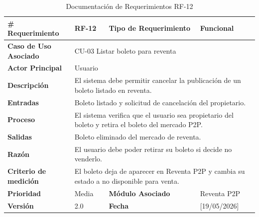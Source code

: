 \documentclass[12pt,letterpaper]{article}
\begin{document}
\begin{table}[H]
\centering
\scriptsize
\renewcommand{\arraystretch}{1.05}
\setlength{\tabcolsep}{3pt}

\newlength{\anchoceldaRFdoce}
\setlength{\anchoceldaRFdoce}{\dimexpr\textwidth-2.7cm-8\tabcolsep-5\arrayrulewidth\relax}

\begin{tabularx}{\textwidth}{|p{2.7cm}|X|p{2.8cm}|X|}
\hline
\textbf{\# Requerimiento} & RF-12 & \textbf{Tipo de Requerimiento} & Funcional \\ \hline

\textbf{Caso de Uso Asociado} & 
\multicolumn{3}{p{\anchoceldaRFdoce}|}{CU-03 Listar boleto para reventa} \\ \hline

\textbf{Actor Principal} & 
\multicolumn{3}{p{\anchoceldaRFdoce}|}{Usuario} \\ \hline

\textbf{Descripción} & 
\multicolumn{3}{p{\anchoceldaRFdoce}|}{El sistema debe permitir cancelar la publicación de un boleto listado en reventa.} \\ \hline

\textbf{Entradas} & 
\multicolumn{3}{p{\anchoceldaRFdoce}|}{Boleto listado y solicitud de cancelación del propietario.} \\ \hline

\textbf{Proceso} & 
\multicolumn{3}{p{\anchoceldaRFdoce}|}{El sistema verifica que el usuario sea propietario del boleto y retira el boleto del mercado P2P.} \\ \hline

\textbf{Salidas} & 
\multicolumn{3}{p{\anchoceldaRFdoce}|}{Boleto eliminado del mercado de reventa.} \\ \hline

\textbf{Razón} & 
\multicolumn{3}{p{\anchoceldaRFdoce}|}{El usuario debe poder retirar su boleto si decide no venderlo.} \\ \hline

\textbf{Criterio de medición} & 
\multicolumn{3}{p{\anchoceldaRFdoce}|}{El boleto deja de aparecer en Reventa P2P y cambia su estado a no disponible para venta.} \\ \hline

\textbf{Prioridad} & Media & \textbf{Módulo Asociado} & Reventa P2P \\ \hline

\textbf{Versión} & 2.0 & \textbf{Fecha} & [19/05/2026] \\ \hline

\end{tabularx}

\caption{Documentación de Requerimientos RF-12}
\label{tab:documentacion_requerimientos_rf12}
\normalsize
\end{table}
\end{document}
